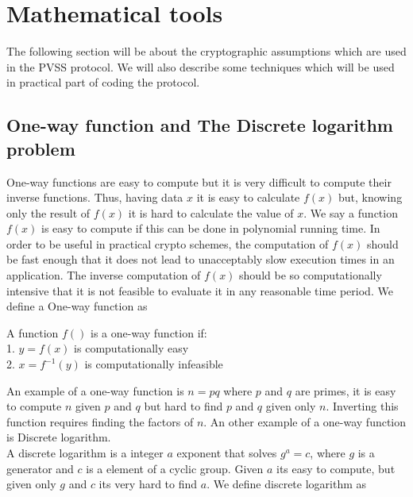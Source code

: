 \section{Mathematical tools}
The following section will be about the cryptographic assumptions which are used in the PVSS protocol. We will also describe some techniques which will be used in practical part of coding the protocol.

\subsection{One-way function and The Discrete logarithm problem} %

 One-way functions are easy to compute but it is very difficult to compute their inverse functions. Thus, having data $x$ it is easy to calculate $f(x)$ but,  
knowing only the result of $f(x)$ it is hard to calculate the value of $x$. We say a function $f(x)$ is easy to compute if this can be done in polynomial running time. 
In order to be useful in practical crypto schemes, the computation of $f(x)$ should be fast enough that it does not lead to unacceptably slow execution times in an application. The inverse
computation of $f(x)$ should be so computationally intensive that it is not feasible to evaluate it in any reasonable time period. We define a One-way function as \\

\begin{defi}
A function $f()$ is a one-way function if:      \\
1. $y = f (x)$ is computationally easy           \\
2. $x = f^{-1}(y)$ is computationally infeasible    
\end{defi}

\noindent
An example of a one-way function is $n = pq$ where $p$ and $q$ are primes, it is easy to compute $n$ given $p$ and $q$ but hard to find $p$ and $q$ given only $n$. 
Inverting this function requires finding the factors of $n$.
An other example of a one-way function is Discrete logarithm. \\


 A discrete logarithm is a integer $a$ exponent that solves $g^a=c$, where $g$ is a generator and $c$ is a element of a cyclic group. Given $a$ its easy to compute, but given only $g$ and $c$ its very hard to find $a$. We define discrete logarithm as \\

